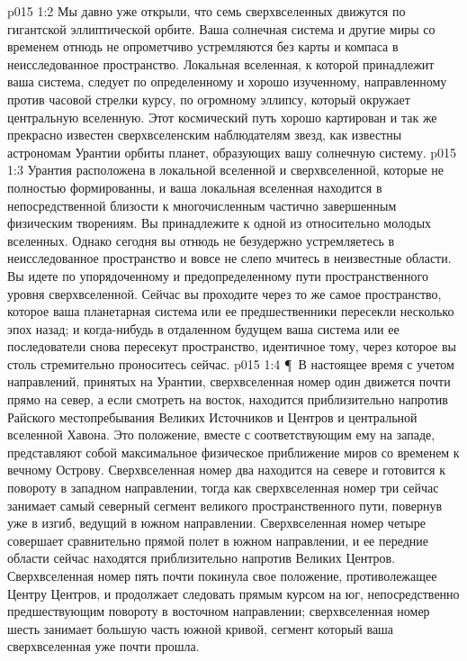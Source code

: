 \vs p015 1:2 Мы давно уже открыли, что семь сверхвселенных движутся по гигантской эллиптической орбите. Ваша солнечная система и другие миры со временем отнюдь не опрометчиво устремляются без карты и компаса в неисследованное пространство. Локальная вселенная, к которой принадлежит ваша система, следует по определенному и хорошо изученному, направленному против часовой стрелки курсу, по огромному эллипсу, который окружает центральную вселенную. Этот космический путь хорошо картирован и так же прекрасно известен сверхвселенским наблюдателям звезд, как известны астрономам Урантии орбиты планет, образующих вашу солнечную систему.
\vs p015 1:3 Урантия расположена в локальной вселенной и сверхвселенной, которые не полностью формированны, и ваша локальная вселенная находится в непосредственной близости к многочисленным частично завершенным физическим творениям. Вы принадлежите к одной из относительно молодых вселенных. Однако сегодня вы отнюдь не безудержно устремляетесь в неисследованное пространство и вовсе не слепо мчитесь в неизвестные области. Вы идете по упорядоченному и предопределенному пути пространственного уровня сверхвселенной. Сейчас вы проходите через то же самое пространство, которое ваша планетарная система или ее предшественники пересекли несколько эпох назад; и когда\hyp{}нибудь в отдаленном будущем ваша система или ее последователи снова пересекут пространство, идентичное тому, через которое вы столь стремительно проноситесь сейчас.
\vs p015 1:4 \P\ В настоящее время с учетом направлений, принятых на Урантии, сверхвселенная номер один движется почти прямо на север, а если смотреть на восток, находится приблизительно напротив Райского местопребывания Великих Источников и Центров и центральной вселенной Хавона. Это положение, вместе с соответствующим ему на западе, представляют собой максимальное физическое приближение миров со временем к вечному Острову. Сверхвселенная номер два находится на севере и готовится к повороту в западном направлении, тогда как сверхвселенная номер три сейчас занимает самый северный сегмент великого пространственного пути, повернув уже в изгиб, ведущий в южном направлении. Сверхвселенная номер четыре совершает сравнительно прямой полет в южном направлении, и ее передние области сейчас находятся приблизительно напротив Великих Центров. Сверхвселенная номер пять почти покинула свое положение, противолежащее Центру Центров, и продолжает следовать прямым курсом на юг, непосредственно предшествующим повороту в восточном направлении; сверхвселенная номер шесть занимает большую часть южной кривой, сегмент который ваша сверхвселенная уже почти прошла.
